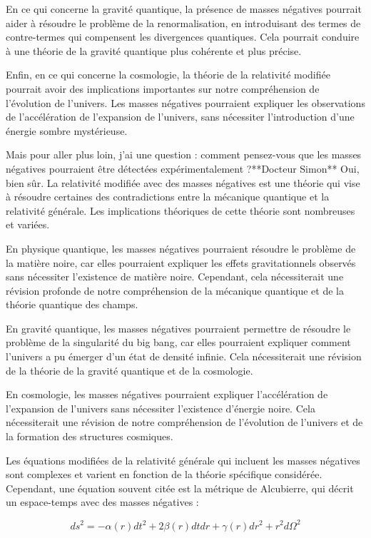 En ce qui concerne la gravité quantique, la présence de masses négatives pourrait aider à résoudre le problème de la renormalisation, en introduisant des termes de contre-termes qui compensent les divergences quantiques. Cela pourrait conduire à une théorie de la gravité quantique plus cohérente et plus précise.

Enfin, en ce qui concerne la cosmologie, la théorie de la relativité modifiée pourrait avoir des implications importantes sur notre compréhension de l'évolution de l'univers. Les masses négatives pourraient expliquer les observations de l'accélération de l'expansion de l'univers, sans nécessiter l'introduction d'une énergie sombre mystérieuse.

Mais pour aller plus loin, j'ai une question : comment pensez-vous que les masses négatives pourraient être détectées expérimentalement ?**Docteur Simon**
Oui, bien sûr. La relativité modifiée avec des masses négatives est une théorie qui vise à résoudre certaines des contradictions entre la mécanique quantique et la relativité générale. Les implications théoriques de cette théorie sont nombreuses et variées.

En physique quantique, les masses négatives pourraient résoudre le problème de la matière noire, car elles pourraient expliquer les effets gravitationnels observés sans nécessiter l'existence de matière noire. Cependant, cela nécessiterait une révision profonde de notre compréhension de la mécanique quantique et de la théorie quantique des champs.

En gravité quantique, les masses négatives pourraient permettre de résoudre le problème de la singularité du big bang, car elles pourraient expliquer comment l'univers a pu émerger d'un état de densité infinie. Cela nécessiterait une révision de la théorie de la gravité quantique et de la cosmologie.

En cosmologie, les masses négatives pourraient expliquer l'accélération de l'expansion de l'univers sans nécessiter l'existence d'énergie noire. Cela nécessiterait une révision de notre compréhension de l'évolution de l'univers et de la formation des structures cosmiques.

Les équations modifiées de la relativité générale qui incluent les masses négatives sont complexes et varient en fonction de la théorie spécifique considérée. Cependant, une équation souvent citée est la métrique de Alcubierre, qui décrit un espace-temps avec des masses négatives :

$$ds^2 = -\alpha(r) dt^2 + 2\beta(r) dt dr + \gamma(r) dr^2 + r^2 d\Omega^2$$

